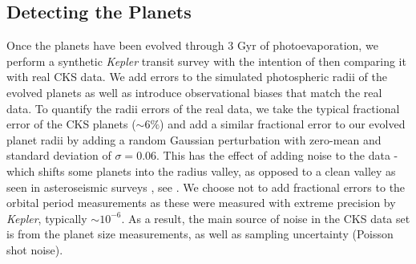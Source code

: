 \documentclass[fleqn,usenatbib]{mnras}
\begin{document}
\subsection{Detecting the Planets} \label{Sec:Detection}
Once the planets have been evolved through 3 Gyr of photoevaporation, we perform a synthetic \textit{Kepler} transit survey with the intention of then comparing it with real CKS data. We add errors to the simulated photospheric radii of the evolved planets as well as introduce observational biases that match the real data. To quantify the radii errors of the real data, we take the typical fractional error of the CKS planets ($\sim 6\%$) and add a similar fractional error to our evolved planet radii by adding a random Gaussian perturbation with zero-mean and standard deviation of $\sigma=0.06$. This has the effect of adding noise to the data - which shifts some planets into the radius valley, as opposed to a clean valley as seen in asteroseismic surveys \citep{VanEylen2018}, see \citet{Petigura2020}. We choose not to add fractional errors to the orbital period measurements as these were measured with extreme precision by \textit{Kepler}, typically $\sim 10^{-6}$. As a result, the main source of noise in the CKS data set is from the planet size measurements, as well as sampling uncertainty (Poisson shot noise).
\end{document}
